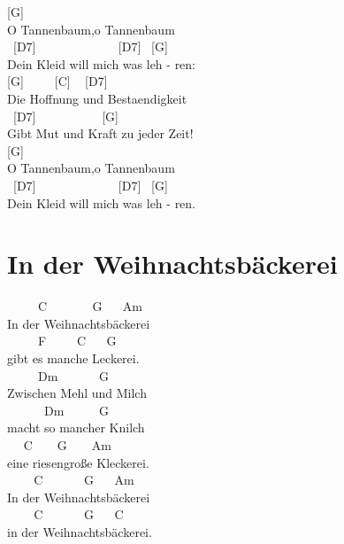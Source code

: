 \documentclass[
  letterpaper,
]{scrbook}
\begin{document}
{[}G{]} ~ ~\\
O Tannenbaum,o Tannenbaum\\
\hspace*{0.333em} ~{[}D7{]} ~ ~ ~ ~ ~ ~ ~ ~{[}D7{]} ~{[}G{]} ~ ~\\
Dein Kleid will mich was leh - ren:\\
\hspace*{0.333em} {[}G{]} ~ ~ ~{[}C{]} ~ {[}D7{]} ~\\
Die Hoffnung und Bestaendigkeit\\
\hspace*{0.333em} ~{[}D7{]} ~ ~ ~ ~ ~ ~ {[}G{]} ~\\
Gibt Mut und Kraft zu jeder Zeit!\\
{[}G{]} ~\\
O Tannenbaum,o Tannenbaum\\
\hspace*{0.333em} ~{[}D7{]} ~ ~ ~ ~ ~ ~ ~ ~{[}D7{]} ~{[}G{]} ~ ~\\
Dein Kleid will mich was leh - ren.

\hypertarget{in-der-weihnachtsbuxe4ckerei}{%
\chapter{In der Weihnachtsbäckerei}\label{in-der-weihnachtsbuxe4ckerei}}

~ ~ ~ C ~ ~ ~ ~ G ~ ~Am\\
In der Weihnachtsbäckerei\\
\hspace*{0.333em} ~ ~ ~ F ~ ~ ~C ~ ~G\\
gibt es manche Leckerei. ~ ~\\
\hspace*{0.333em} ~ ~ ~ Dm ~ ~ ~ ~G\\
Zwischen Mehl und Milch ~\\
\hspace*{0.333em} ~ ~ ~ ~Dm ~ ~ ~ G\\
macht so mancher Knilch ~ ~\\
\hspace*{0.333em} ~ ~C ~ ~ G ~ ~ Am\\
eine riesengroße Kleckerei.\\
\hspace*{0.333em} ~ ~ ~C ~ ~ ~ ~G ~ ~Am\\
In der Weihnachtsbäckerei ~\\
\hspace*{0.333em} ~ ~ ~C ~ ~ ~ ~G ~ ~C\\
in der Weihnachtsbäckerei.
\end{document}
